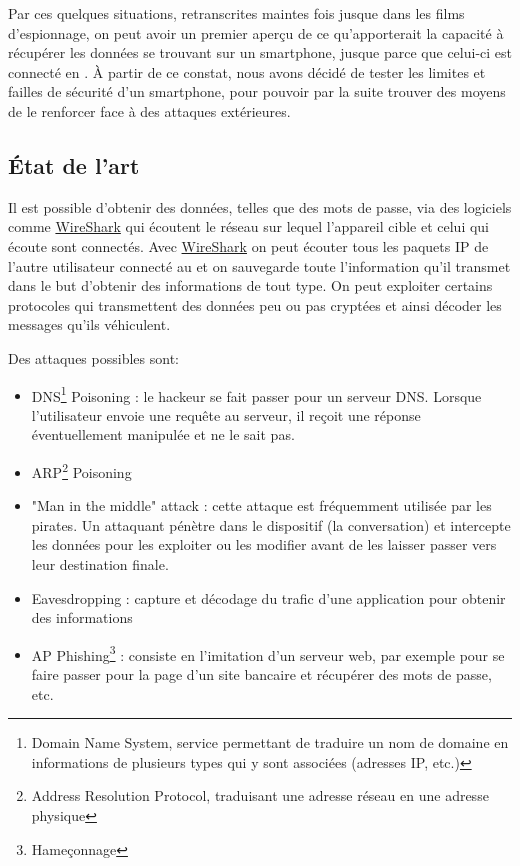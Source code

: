 \documentclass[a4paper, 12pt,twoside]{article}
\begin{document}
	Par ces quelques situations, retranscrites maintes fois jusque dans les films d'espionnage, on peut avoir un premier aperçu de ce qu'apporterait la capacité à récupérer les données se trouvant sur un smartphone, jusque parce que celui-ci est connecté en \wifi{}. À partir de ce constat, nous avons décidé de tester les limites et failles de sécurité d'un smartphone, pour pouvoir par la suite trouver des moyens de le renforcer face à des attaques extérieures.
		
	\subsection{État de l'art}
	
	Il est possible d'obtenir des données, telles que des mots de passe, via des logiciels comme \newcommand{\wireshark}{\href{https://www.wireshark.org}{WireShark}} \wireshark{} qui écoutent le réseau \wifi{} sur lequel l'appareil cible et celui qui écoute sont connectés. Avec \wireshark{} on peut écouter tous les paquets IP de l'autre utilisateur connecté au \wifi{} et on sauvegarde toute l'information qu'il transmet dans le but d'obtenir des informations de tout type. On peut exploiter certains protocoles qui transmettent des données peu ou pas cryptées et ainsi décoder les messages qu'ils véhiculent. 
	
	Des attaques possibles sont: 
	
	\begin{itemize}\setlength{\parskip}{0pt}
		\item DNS\footnote{Domain Name System, service permettant de traduire un nom de domaine en informations de plusieurs types qui y sont associées (adresses IP, etc.)} Poisoning : le hackeur se fait passer pour un serveur DNS. Lorsque l'utilisateur envoie une requête au serveur, il reçoit une réponse éventuellement manipulée et ne le sait pas. 
		\item ARP\footnote{Address Resolution Protocol, traduisant une adresse réseau en une adresse physique} Poisoning
		\item "Man in the middle" attack : cette attaque est fréquemment utilisée par les pirates. Un attaquant pénètre dans le dispositif (la conversation) et intercepte les données pour les exploiter ou les modifier avant de les laisser passer vers leur destination finale.
		\item Eavesdropping : capture et décodage du trafic d'une application pour obtenir des informations
		\item AP Phishing\footnote{Hameçonnage} : consiste en l'imitation d'un serveur web, par exemple pour se faire passer pour la page d'un site bancaire et récupérer des mots de passe, etc.
	\end{itemize}
\end{document}
